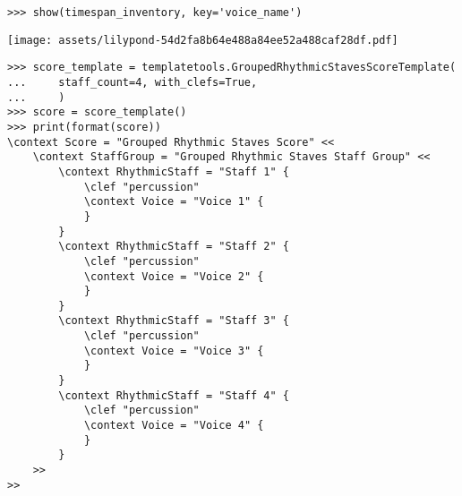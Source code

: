 \begin{comment}
<abjad>
show(timespan_inventory, key='voice_name')
score_template = templatetools.GroupedRhythmicStavesScoreTemplate(
    staff_count=4, with_clefs=True,
    )
score = score_template()
print(format(score))
</abjad>
\end{comment}

\begin{singlespacing}
\vspace{-0.5\baselineskip}
\begin{lstlisting}
>>> show(timespan_inventory, key='voice_name')
\end{lstlisting}
\noindent\texttt{[image: assets/lilypond-54d2fa8b64e488a84ee52a488caf28df.pdf]}
\begin{lstlisting}
>>> score_template = templatetools.GroupedRhythmicStavesScoreTemplate(
...     staff_count=4, with_clefs=True,
...     )
>>> score = score_template()
>>> print(format(score))
\context Score = "Grouped Rhythmic Staves Score" <<
    \context StaffGroup = "Grouped Rhythmic Staves Staff Group" <<
        \context RhythmicStaff = "Staff 1" {
            \clef "percussion"
            \context Voice = "Voice 1" {
            }
        }
        \context RhythmicStaff = "Staff 2" {
            \clef "percussion"
            \context Voice = "Voice 2" {
            }
        }
        \context RhythmicStaff = "Staff 3" {
            \clef "percussion"
            \context Voice = "Voice 3" {
            }
        }
        \context RhythmicStaff = "Staff 4" {
            \clef "percussion"
            \context Voice = "Voice 4" {
            }
        }
    >>
>>
\end{lstlisting}
\end{singlespacing}

